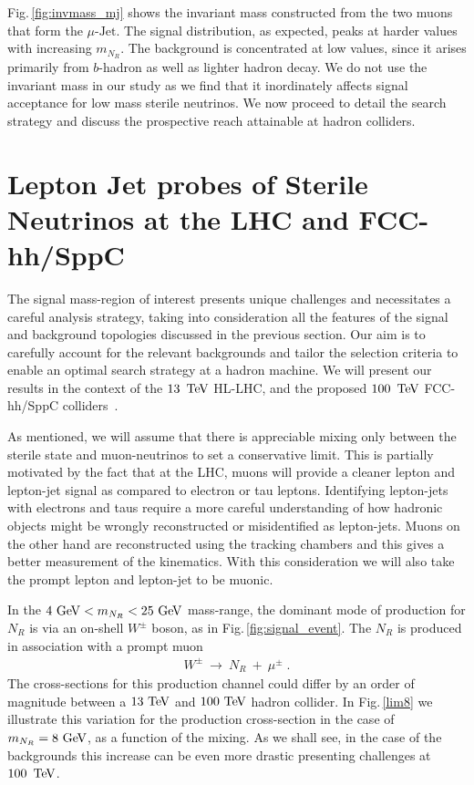 \documentclass[reprint,doublecolumn,secnumarabic,amssymb, amsmath, aps,nofootinbib,superscriptaddress]{revtex4-1}
\newcommand{\ba}{\begin{eqnarray*}}
\newcommand{\ea}{\end{eqnarray*}}
\newcommand{\Fig}[1]{Fig.\,\ref{#1}}
\def\TeV{\ifmmode {\mathrm{\ Te\kern -0.1em V}}\else
                   \textrm{Te\kern -0.1em V}\fi}%
\def\GeV{\ifmmode {\mathrm{\ Ge\kern -0.1em V}}\else
                   \textrm{Ge\kern -0.1em V}\fi}%
\begin{document}
\Fig{fig:invmass_mj} shows the invariant mass constructed from the two muons that form the $\mu\text{-Jet}$. The signal distribution, as expected, peaks at harder values
with increasing $m_{N_R}$. The background is concentrated at low values, since it arises primarily from $b$-hadron as well as lighter hadron decay.
We do not use the invariant mass in our study as we find that it inordinately affects signal acceptance for low mass sterile neutrinos.
We now proceed to detail the search strategy and discuss the prospective reach attainable at hadron colliders.

\section{\label{sec:4} Lepton Jet probes of Sterile Neutrinos at the LHC and FCC-\lowercase{hh}/S\lowercase{pp}C }
\label{sec:4}

The signal mass-region of interest presents unique challenges and necessitates a careful analysis strategy, taking into consideration all the features of the signal and background topologies discussed in the previous section. Our aim is to carefully account for the relevant backgrounds and tailor the selection criteria to enable an optimal search strategy at a hadron machine. We will present our results in the context of the $13\,\TeV$ HL-LHC, and the proposed $100\,\TeV$ FCC-hh/SppC colliders~\cite{Golling:2016gvc,CEPC-SPPCStudyGroup:2015csa}. 

As mentioned, we will assume that there is appreciable mixing only between the sterile state and muon-neutrinos to set a conservative limit. This is partially motivated by the fact that at the LHC, muons will provide a cleaner lepton and lepton-jet signal as compared to electron or tau leptons. Identifying lepton-jets with electrons and taus require a more careful understanding of how hadronic objects might be wrongly reconstructed or misidentified as lepton-jets. Muons on the other hand are reconstructed using the tracking chambers and this gives a better measurement of the kinematics. With this consideration we will also take the prompt lepton and lepton-jet to be muonic.

In the $4 \GeV<m_{N_R} < 25\GeV$ mass-range, the dominant mode of production for $N_R$ is via an on-shell $W^\pm$ boson, as in \Fig{fig:signal_event}. The $N_R$ is produced in association with a prompt muon
\ba
W^{\pm}~\rightarrow~ N_R ~ + ~\mu^{\pm}\; .
\ea
The cross-sections for this production channel could differ by an order of magnitude between a $13\TeV$ and $100\TeV$ hadron collider. In \Fig{lim8} we illustrate this variation for the production cross-section in the case of $m_{N_R}=8\GeV$, as a function of the mixing. As we shall see, in the case of the backgrounds this increase can be even more drastic presenting challenges at $100\,\TeV$.
\end{document}
